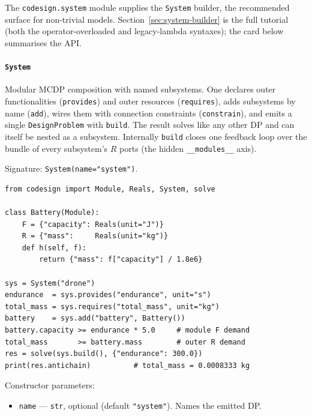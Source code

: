 \documentclass[11pt,a4paper]{article}
\begin{document}
The \texttt{codesign.system} module supplies the \texttt{System} builder,
the recommended surface for non-trivial models. Section~\ref{sec:system-builder}
is the full tutorial (both the operator-overloaded and legacy-lambda
syntaxes); the card below summarises the API.

\paragraph{\texttt{System}}\label{ref:system:system}
Modular MCDP composition with named subsystems. One declares outer
functionalities (\texttt{provides}) and outer resources (\texttt{requires}),
adds subsystems by name (\texttt{add}), wires them with connection
constraints (\texttt{constrain}), and emits a single \texttt{DesignProblem}
with \texttt{build}. The result solves like any other DP and can itself be
nested as a subsystem. Internally \texttt{build} closes one feedback loop
over the bundle of every subsystem's $R$ ports (the hidden
\texttt{\_\_modules\_\_} axis).

Signature: \texttt{System(name="system")}.

\begin{lstlisting}
from codesign import Module, Reals, System, solve

class Battery(Module):
    F = {"capacity": Reals(unit="J")}
    R = {"mass":     Reals(unit="kg")}
    def h(self, f):
        return {"mass": f["capacity"] / 1.8e6}

sys = System("drone")
endurance  = sys.provides("endurance", unit="s")
total_mass = sys.requires("total_mass", unit="kg")
battery    = sys.add("battery", Battery())
battery.capacity >= endurance * 5.0     # module F demand
total_mass       >= battery.mass        # outer R demand
res = solve(sys.build(), {"endurance": 300.0})
print(res.antichain)          # total_mass = 0.0008333 kg
\end{lstlisting}

Constructor parameters:
\begin{itemize}[nosep]
  \item \texttt{name} --- \texttt{str}, optional (default
        \texttt{"system"}). Names the emitted DP.
\end{itemize}
\end{document}
